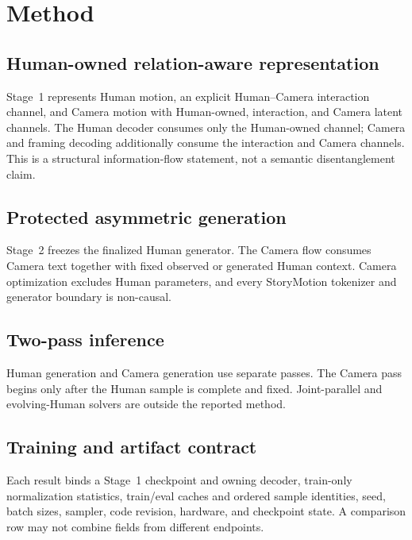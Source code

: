 \section{Method}

\subsection{Human-owned relation-aware representation}

Stage~1 represents Human motion, an explicit Human--Camera interaction channel, and Camera
motion with Human-owned, interaction, and Camera latent channels. The Human decoder consumes
only the Human-owned channel; Camera and framing decoding additionally consume the interaction
and Camera channels. This is a structural information-flow statement, not a semantic
disentanglement claim.

\subsection{Protected asymmetric generation}

Stage~2 freezes the finalized Human generator. The Camera flow consumes Camera text together
with fixed observed or generated Human context. Camera optimization excludes Human parameters,
and every StoryMotion tokenizer and generator boundary is non-causal.

\subsection{Two-pass inference}

Human generation and Camera generation use separate passes. The Camera pass begins only after
the Human sample is complete and fixed. Joint-parallel and evolving-Human solvers are outside
the reported method.

\subsection{Training and artifact contract}

Each result binds a Stage~1 checkpoint and owning decoder, train-only normalization statistics,
train/eval caches and ordered sample identities, seed, batch sizes, sampler, code revision,
hardware, and checkpoint state. A comparison row may not combine fields from different
endpoints.

